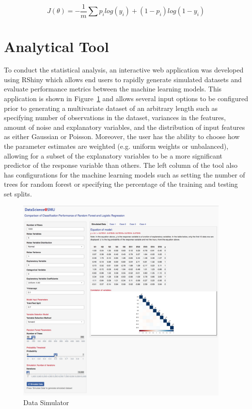 \documentclass{llncs}
\begin{document}
\begin{equation}
J(\theta) = -\frac{1}{m}\sum p_{i}log(y_{i}) + (1-p_{i})log(1-y_{i})
\end{equation}

 
\section{Analytical Tool}

\noindent 
To conduct the statistical analysis, an interactive web application was developed using RShiny which allows end users to rapidly generate simulated datasets and evaluate performance metrics between the machine learning models. This application is shown in Figure~\ref{fig:rshiny} and allows several input options to be configured prior to generating a multivariate dataset of an arbitrary length such as specifying number of observations in the dataset, variances in the features, amount of noise and explanatory variables, and the distribution of input features as either Gaussian or Poisson. Moreover, the user has the ability to choose how the parameter estimates are weighted (e.g. uniform weights or unbalanced), allowing for a subset of the explanatory variables to be a more significant predictor of the response variable than others. The left column of the tool also has configurations for the machine learning models such as setting the number of trees for random forest or specifying the percentage of the training and testing set splits.

\begin{figure}
\centering
\includegraphics[width=0.95\textwidth]{full-tool.png}
\caption{Data Simulator}
\label{fig:rshiny}
\end{figure}
\end{document}
